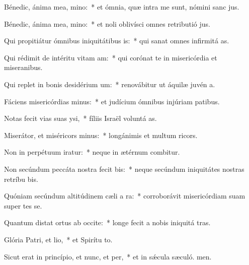 \item Bénedic, ánima mea, mino:~* et ómnia, quæ intra me sunt, nómini sanc jus.
\item Bénedic, ánima mea, mino:~* et noli oblivísci omnes retributió jus.
\item Qui propitiátur ómnibus iniquitátibus is:~* qui sanat omnes infirmitá as.
\item Qui rédimit de intéritu vitam am:~* qui corónat te in misericórdia et miseranibus.
\item Qui replet in bonis desidérium um:~* renovábitur ut áquilæ juvén a.
\item Fáciens misericórdias minus:~* et judícium ómnibus injúriam patibus.
\item Notas fecit vias suas ysi,~* fíliis Israël voluntá as.
\item Miserátor, et miséricors minus:~* longánimis et multum ricors.
\item Non in perpétuum iratur:~* neque in ætérnum combitur.
\item Non secúndum peccáta nostra fecit bis:~* neque secúndum iniquitátes nostras retríbu bis.
\item Quóniam secúndum altitúdinem cæli a ra:~* corroborávit misericórdiam suam super tes se.
\item Quantum distat ortus ab occite:~* longe fecit a nobis iniquitá tras.
\item Glória Patri, et lio,~* et Spirítu to.
\item Sicut erat in princípio, et nunc, et per,~* et in sǽcula sæculó. men.
